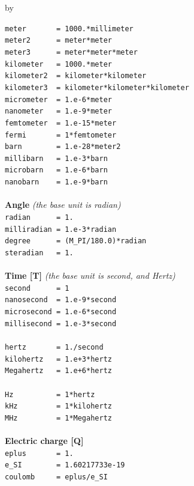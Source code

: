 \documentclass[twoside]{article}
\newcommand{\entrylabel}[1]{\mbox{\textbf{{#1}}}\hfil}%
\newenvironment{entry}
{\begin{list}{}%
    {\renewcommand{\makelabel}{\entrylabel}%
     \setlength{\labelwidth}{90pt}%
     \setlength{\leftmargin}{\labelwidth}
     \advance\leftmargin by \labelsep%
      }%
    }%
  {\end{list}}
\newcommand{\Entrylabel}[1]%
{\raisebox{0pt}[1ex][0pt]{\makebox[\labelwidth][l]%
    {\parbox[t]{\labelwidth}{\hspace{0pt}\textbf{{#1}}}}}}
\newenvironment{Entry}%
{\renewcommand{\entrylabel}{\Entrylabel}\begin{entry}}%
  {\end{entry}}
\begin{document}
\begin{Entry}
  \verb+meter       = 1000.*millimeter+ \\  
  \verb+meter2      = meter*meter+ \\
  \verb+meter3      = meter*meter*meter+ \\

  \verb+kilometer   = 1000.*meter+ \\
  \verb+kilometer2  = kilometer*kilometer+ \\
  \verb+kilometer3  = kilometer*kilometer*kilometer+ \\

  \verb+micrometer  = 1.e-6*meter+ \\
  \verb+nanometer   = 1.e-9*meter+ \\
  \verb+femtometer  = 1.e-15*meter+ \\
  \verb+fermi       = 1*femtometer+ \\

  \verb+barn        = 1.e-28*meter2+ \\           
  \verb+millibarn   = 1.e-3*barn+ \\  
  \verb+microbarn   = 1.e-6*barn+ \\
  \verb+nanobarn    = 1.e-9*barn+ \\ \\ 
{\bf Angle} {\it (the base unit is radian)}\\
  \verb+radian      = 1.+  \\ 
  \verb+milliradian = 1.e-3*radian+ \\ 
  \verb+degree      = (M_PI/180.0)*radian+ \\
  \verb+steradian   = 1. +\\ \\
{\bf Time [T]} {\it (the base unit is second, and Hertz)}\\
  \verb#second      = 1# \\
  \verb+nanosecond  = 1.e-9*second+\\ 
  \verb+microsecond = 1.e-6*second+\\ 
  \verb+millisecond = 1.e-3*second+ \\ \\ 
  \verb+hertz       = 1./second+ \\ 
  \verb#kilohertz   = 1.e+3*hertz# \\
  \verb#Megahertz   = 1.e+6*hertz# \\ \\
  \verb+Hz          = 1*hertz+ \\ 
  \verb#kHz         = 1*kilohertz# \\
  \verb#MHz         = 1*Megahertz# \\ \\
{\bf Electric charge [Q]} \\
  \verb+eplus       = 1.+ \\
  \verb+e_SI        = 1.60217733e-19+ \\
  \verb+coulomb     = eplus/e_SI+ \\
  

\end{Entry}
\end{document}
